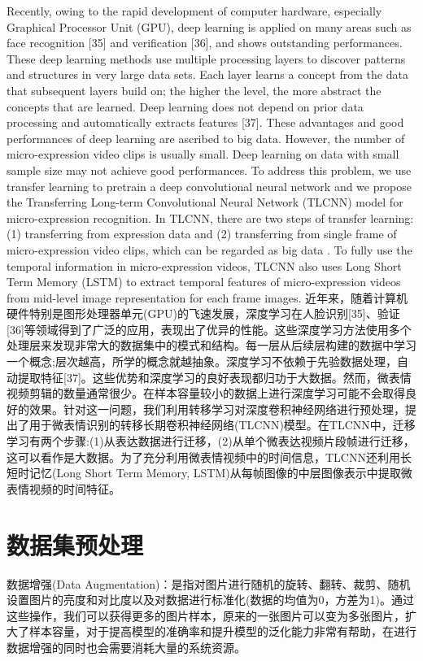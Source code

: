 Recently, owing to the rapid development of computer hardware, especially Graphical Processor Unit (GPU), deep learning is applied on many areas such as face recognition [35] and verification [36], and shows outstanding performances. These deep learning methods use multiple processing layers to discover patterns and structures in very large data sets. Each layer learns a concept from the data that subsequent layers build on; the higher the level, the more abstract the concepts that are learned. Deep learning does not depend on prior data processing and automatically extracts features [37]. These advantages and good performances of deep learning are ascribed to big data. However, the number of micro-expression video clips is usually small. Deep learning on data with small sample size may not achieve good performances. To address this problem, we use transfer learning to pretrain a deep convolutional neural network and we propose the Transferring Long-term Convolutional Neural Network (TLCNN) model for micro-expression recognition. In TLCNN, there are two steps of transfer learning: (1) transferring from expression data and (2) transferring from single frame of micro-expression video clips, which can be regarded as big data . To fully use the temporal information in micro-expression videos, TLCNN also uses Long Short Term Memory (LSTM) to extract temporal features of micro-expression videos from mid-level image representation for each frame images.
近年来，随着计算机硬件特别是图形处理器单元(GPU)的飞速发展，深度学习在人脸识别[35]、验证[36]等领域得到了广泛的应用，表现出了优异的性能。这些深度学习方法使用多个处理层来发现非常大的数据集中的模式和结构。每一层从后续层构建的数据中学习一个概念;层次越高，所学的概念就越抽象。深度学习不依赖于先验数据处理，自动提取特征[37]。这些优势和深度学习的良好表现都归功于大数据。然而，微表情视频剪辑的数量通常很少。在样本容量较小的数据上进行深度学习可能不会取得良好的效果。针对这一问题，我们利用转移学习对深度卷积神经网络进行预处理，提出了用于微表情识别的转移长期卷积神经网络(TLCNN)模型。在TLCNN中，迁移学习有两个步骤:(1)从表达数据进行迁移，(2)从单个微表达视频片段帧进行迁移，这可以看作是大数据。为了充分利用微表情视频中的时间信息，TLCNN还利用长短时记忆(Long Short Term Memory, LSTM)从每帧图像的中层图像表示中提取微表情视频的时间特征。
\section{数据集预处理}

数据增强(Data Augmentation)：是指对图片进行随机的旋转、翻转、裁剪、随机设置图片的亮度和对比度以及对数据进行标准化(数据的均值为0，方差为1)。通过这些操作，我们可以获得更多的图片样本，原来的一张图片可以变为多张图片，扩大了样本容量，对于提高模型的准确率和提升模型的泛化能力非常有帮助，在进行数据增强的同时也会需要消耗大量的系统资源。


